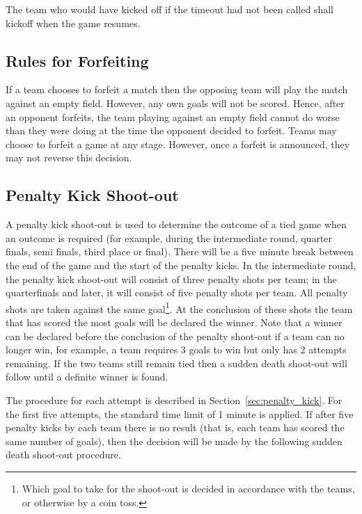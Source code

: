 \documentclass[12pt]{article}
\begin{document}
The team who would have kicked off if the timeout had not been called shall kickoff when the game resumes.

\subsection{Rules for Forfeiting}
\label{sec:forfeit}

If a team chooses to forfeit a match then the opposing team will play the match against an empty field.  However, any own goals will not be scored.  Hence, after an opponent forfeits, the team playing against an empty field cannot do worse than they were doing at the time the opponent decided to forfeit.  Teams may choose to forfeit a game at any stage.  However, once a forfeit is announced, they may not reverse this decision.


\subsection{Penalty Kick Shoot-out}
\label{sec:penalty_shoot-out}

A penalty kick shoot-out is used to determine the outcome of a tied game when an outcome is required (for example, during the intermediate round, quarter finals, semi finals, third place or final). 
There will be a five minute break between the end of the game and the start of the penalty kicks.
In the intermediate round, the penalty kick shoot-out will consist of three penalty shots per team; in the quarterfinals and later, it will consist of five penalty shots per team.
All penalty shots are taken against the same goal\footnote{Which goal to take for the shoot-out is decided in accordance with the teams, or otherwise by a coin toss.}. At the conclusion of these shots the team that has scored the most goals will be declared the winner. Note that a winner can be declared before the conclusion of the penalty shoot-out if a team can no longer win, for example, a team requires 3 goals to win but only has 2 attempts remaining. If the two teams still remain tied then a sudden death shoot-out will follow until a definite winner is found.

The procedure for each attempt is described in Section~\ref{sec:penalty_kick}. For the first five attempts, the standard time limit of 1 minute is applied. If after five penalty kicks by each team there is no result (that is, each team has scored the same number of goals), then the decision will be made by the following sudden death shoot-out procedure.
\end{document}
